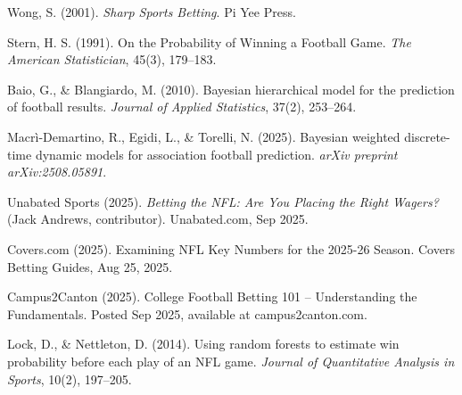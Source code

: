 \documentclass[11pt]{amsart}
\begin{document}
\bigskip
\begin{thebibliography}{99}

 Wong, S. (2001). \textit{Sharp Sports Betting}. Pi Yee Press.

 Stern, H. S. (1991). On the Probability of Winning a Football Game. \textit{The American Statistician}, 45(3), 179--183.

 Baio, G., \& Blangiardo, M. (2010). Bayesian hierarchical model for the prediction of football results. \textit{Journal of Applied Statistics}, 37(2), 253--264.

 Macrì-Demartino, R., Egidi, L., \& Torelli, N. (2025). Bayesian weighted discrete-time dynamic models for association football prediction. \textit{arXiv preprint arXiv:2508.05891}.

 Unabated Sports (2025). \textit{Betting the NFL: Are You Placing the Right Wagers?} (Jack Andrews, contributor). Unabated.com, Sep 2025.

 Covers.com (2025). Examining NFL Key Numbers for the 2025-26 Season. Covers Betting Guides, Aug 25, 2025.

 Campus2Canton (2025). College Football Betting 101 – Understanding the Fundamentals. Posted Sep 2025, available at campus2canton.com.

 Lock, D., \& Nettleton, D. (2014). Using random forests to estimate win probability before each play of an NFL game. \textit{Journal of Quantitative Analysis in Sports}, 10(2), 197--205.

\end{thebibliography}
\end{document}
